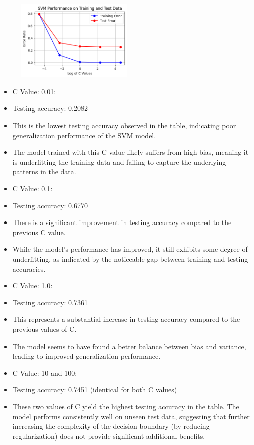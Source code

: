 \documentclass[a4paper,10 pt]{article}
\begin{document}
  \begin{figure}[H]
    \centering
    \includegraphics[width=0.5\textwidth]{graphQ5ar.png} %
  \end{figure}
    
  \vspace{12pt}

  \begin{itemize}

    \item  C Value: 0.01:
    \item [] Testing accuracy: 0.2082
    \item [] This is the lowest testing accuracy observed in the table, indicating poor generalization performance of the SVM model.
    \item [] The model trained with this C value likely suffers from high bias, meaning it is underfitting the training data and failing to capture the underlying patterns in the data.
    \item C Value: 0.1:
    \item [] Testing accuracy: 0.6770
    \item [] There is a significant improvement in testing accuracy compared to the previous C value.
    \item [] While the model's performance has improved, it still exhibits some degree of underfitting, as indicated by the noticeable gap between training and testing accuracies.
    \item C Value: 1.0:
    \item [] Testing accuracy: 0.7361
    \item [] This represents a substantial increase in testing accuracy compared to the previous values of C.
    \item [] The model seems to have found a better balance between bias and variance, leading to improved generalization performance.
    \item C Value: 10 and 100:
    \item [] Testing accuracy: 0.7451 (identical for both C values)
    \item [] These two values of C yield the highest testing accuracy in the table.
    The model performs consistently well on unseen test data, suggesting that further increasing the complexity of the decision boundary (by reducing regularization) does not provide significant additional benefits.
  \end{itemize}
  
\end{document}
